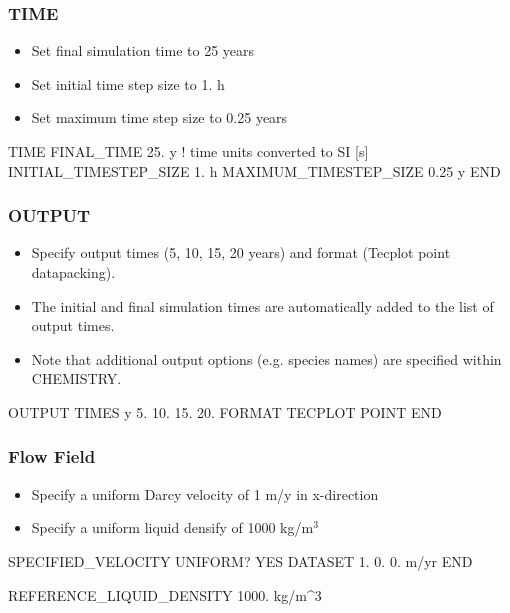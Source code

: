 \documentclass{beamer}
\newcommand\redcomment[1]{{{\color{red} #1}}}
\newcommand\bluecomment[1]{{{\color{blue} #1}}}
\begin{document}
\begin{frame}[fragile]\frametitle{TIME}

\begin{itemize}
\item Set final simulation time to 25 years
\item Set initial time step size to 1. h
\item Set maximum time step size to 0.25 years
\end{itemize}


\begin{semiverbatim}

TIME
  FINAL_TIME 25. \redcomment{y}      \bluecomment{! time units converted to SI [s]}
  INITIAL_TIMESTEP_SIZE 1. \redcomment{h}
  MAXIMUM_TIMESTEP_SIZE 0.25 \redcomment{y}
END
\end{semiverbatim}

\end{frame}

\begin{frame}[fragile]\frametitle{OUTPUT}

\begin{itemize}
\item Specify output times (5, 10, 15, 20 years) and format (Tecplot point datapacking).
\item The initial and final simulation times are automatically added to the list of output times.
\item Note that additional output options (e.g. species names) are specified within CHEMISTRY.
\end{itemize}


\begin{semiverbatim}

OUTPUT
  TIMES \redcomment{y} 5. 10. 15. 20.
  FORMAT TECPLOT POINT
END
\end{semiverbatim}

\end{frame}

\begin{frame}[fragile]\frametitle{Flow Field}

\begin{itemize}
\item Specify a uniform Darcy velocity of 1 m/y in x-direction
\item Specify a uniform liquid densify of 1000 kg/m$^3$
\end{itemize}


\begin{semiverbatim}

SPECIFIED_VELOCITY
  UNIFORM? YES
  DATASET 1. 0. 0. m/yr
END

REFERENCE_LIQUID_DENSITY 1000. kg/m^3
\end{semiverbatim}

\end{frame}
\end{document}
